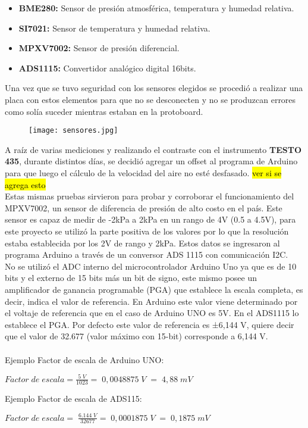 \begin{itemize}
	\item  \textbf{BME280:} Sensor de presión atmosférica, temperatura y humedad relativa.
	\item \textbf{SI7021:} Sensor de temperatura y humedad relativa.
	\item \textbf{MPXV7002:} Sensor de presión diferencial.
	\item \textbf{ADS1115:} Convertidor analógico digital 16bits.
\end{itemize}
Una vez que se tuvo seguridad con los sensores elegidos se procedió a realizar una placa con estos elementos para que no se desconecten y no se produzcan errores como solía suceder mientras estaban en la protoboard. \\
\begin{figure}[htb]
	\centering
	\texttt{[image: sensores.jpg]}
	\label{fig:sensoresa}
\end{figure}
A raíz de varias mediciones y realizando el contraste con el instrumento \textbf{TESTO 435}, durante distintos días, se decidió agregar un offset al programa de Arduino para que luego el cálculo de la velocidad del aire no esté desfasado. \hl{ver si se agrega esto}
\\
Estas mismas pruebas sirvieron para probar y corroborar el funcionamiento del MPXV7002, un sensor de diferencia de presión de alto costo en el país. Este sensor es capaz de medir de -2kPa a 2kPa en un rango de 4V (0.5 a 4.5V), para este proyecto se utilizó la parte positiva de los valores por lo que la resolución estaba establecida por los 2V de rango y 2kPa. Estos datos se ingresaron al programa Arduino a través de un conversor ADS 1115 con comunicación I2C. 
\\
No se utilizó el ADC interno del microcontrolador Arduino Uno ya que es de 10 bits y el externo de 15 bits más un bit de signo, este mismo posee un amplificador de ganancia programable (PGA) que establece la escala completa, es decir, indica el valor de referencia. En Arduino este valor viene determinado por el voltaje de referencia que en el caso de Arduino UNO es 5V. En el ADS1115 lo establece el PGA. Por defecto este valor de referencia es ±6,144 V, quiere decir que el valor de 32.677 (valor máximo con 15-bit) corresponde a 6,144 V.
\\\\
Ejemplo Factor de escala de Arduino UNO:
\begin{center} 
	\begin{math}Factor\;de\;escala=\frac{5\;V}{1023}=\;0,0048875\;V\;=\;4,88\;mV
	\end{math} 
\end{center}
Ejemplo Factor de escala de ADS115:
\begin{center}
	\begin{math}Factor\;de\;escala=\;\frac{6.144\;V}{32677}=\;0,0001875\;V\;=\;0,1875\;mV
	\end{math}
\end{center}

